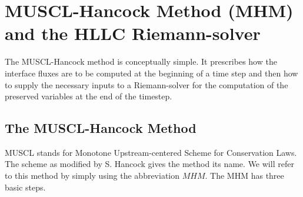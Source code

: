 \documentclass[10pt,letterpaper,notitlepage]{article}
\numberwithin{equation}{section}
\newcommand{\partialderiv}[2]{\frac{\partial #1}{\partial #2}}
\newcommand{\dotp}{\boldsymbol{\cdot}}
\newcommand{\uvec}[1]{\boldsymbol{\hat{\textbf{#1}}}}
\newcommand{\ihat}{\uvec{\i}}
\newcommand{\beqn}{\begin{equation}\begin{aligned}}
\newcommand{\eeqn}{\end{aligned}\end{equation}}
\begin{document}


\newpage
\section{MUSCL-Hancock Method (MHM) and the HLLC Riemann-solver} \label{section:MHM}
The MUSCL-Hancock method is conceptually simple. It prescribes how the interface fluxes are to be computed at the beginning of a time step and then how to supply the necessary inputs to a Riemann-solver for the computation of the preserved variables at the end of the timestep.
\subsection{The MUSCL-Hancock Method}
MUSCL stands for Monotone Upstream-centered Scheme for Conservation Laws. The scheme as modified by S. Hancock gives the method its name. We will refer to this method by simply using the abbreviation $MHM$.
\newline
\newline
\noindent
The MHM has three basic steps.
\end{document}
